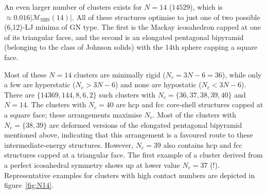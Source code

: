 An even larger number of clusters exists for $N=14$ ($14529$), which is
$\approx 0.016|\mathcal{M}_\mathrm{SHS}(14)|$. All of these structures optimise
to just one of two possible (6,12)-LJ minima of \ac{GN} type. The first is the
Mackay icosahedron capped at one of its triangular faces, and the second is an
elongated pentagonal bipyramid (belonging to the class of Johnson solids) with
the 14th sphere capping a square face.

Most of these $N=14$ clusters are minimally rigid ($N_c=3N-6=36$), while only a
few are hyperstatic ($N_c > 3N-6$) and none are hypostatic ($N_c < 3N-6$).
There are $\{14369,144,8,6,2\}$ such clusters with $N_c=\{36,37,38,39,40\}$ and
$N=14$.  The clusters with $N_c=40$ are hcp and \ac{fcc} core-shell structures
capped at a square face; these arrangements maximise $N_c$. Most of the
clusters with $N_c=\{38,39\}$ are deformed versions of the elongated pentagonal
bipyramid mentioned above, indicating that this arrangement is a favoured route
to these intermediate-energy structures.  However, $N_c=39$ also contains hcp
and \ac{fcc} structures capped at a triangular face.  The first example of a cluster
derived from a perfect icosahedral symmetry shows up at lower value $N_c=37$
(!).  Representative examples for clusters with high contact numbers are
depicted in figure~\ref{fig:N14}.  

